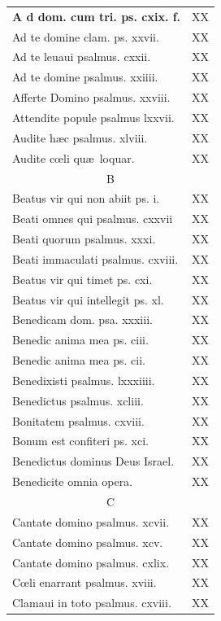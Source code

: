 \documentclass[a5paper,10pt]{book}
\def\ae{æ}
\def\oe{œ}
\begin{document}
\begin{center}
\begin{multicols*}{2}
\begin{tabular}{l r}
\bfseries \color{red} \Huge A\color{black} \normalsize \normalfont d dom. cum tri. ps. cxix. f. & XX\\
Ad te domine clam. ps. xxvii. & XX\\
Ad te leuaui psalmus. cxxii. & XX\\
Ad te domine psalmus. xxiiii. & XX\\
Afferte Domino psalmus. xxviii. & XX\\
Attendite popule psalmus lxxvii. & XX\\
Audite h\ae c psalmus. xlviii. & XX\\
Audite c\oe li qu\ae \ loquar. & XX\\
\multicolumn{2}{c}{\color{red} B}\\
Beatus vir qui non abiit ps. i. & XX\\
Beati omnes qui psalmus. cxxvii & XX\\
Beati quorum psalmus. xxxi. & XX\\
Beati immaculati psalmus. cxviii. & XX\\
Beatus vir qui timet ps. cxi. & XX\\
Beatus vir qui intellegit ps. xl. & XX\\%
Benedicam dom. psa. xxxiii. & XX\\
Benedic anima mea ps. ciii. & XX\\
Benedic anima mea ps. cii. & XX\\
Benedixisti psalmus. lxxxiiii. & XX\\
Benedictus psalmus. xcliii. & XX\\
Bonitatem psalmus. cxviii. & XX\\
Bonum est confiteri ps. xci. & XX\\
Benedictus dominus Deus Israel. & XX\\
Benedicite omnia opera. & XX\\
\multicolumn{2}{c}{\color{red} C}\\
Cantate domino psalmus. xcvii. & XX\\
Cantate domino psalmus. xcv. & XX\\
Cantate domino psalmus. cxlix. & XX\\
C\oe li enarrant psalmus. xviii. & XX\\
Clamaui in toto psalmus. cxviii. & XX\\
\end{tabular}

\end{multicols*}
\end{center}
\end{document}
